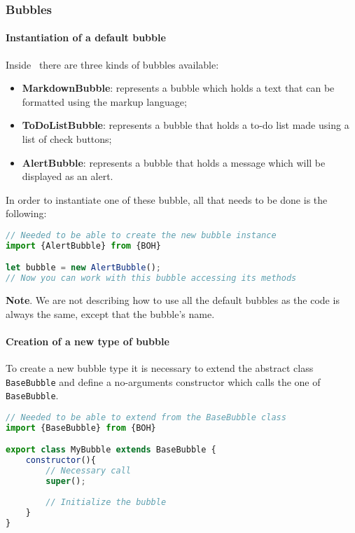 \subsubsection{Bubbles}

\paragraph{Instantiation of a default bubble}
Inside \progettoShort\ there are three kinds of bubbles available:
\begin{itemize}
	\item \textbf{MarkdownBubble}: represents a bubble which holds a text that can be formatted using the  markup language;
	\item \textbf{ToDoListBubble}: represents a bubble that holds a to-do list made using a list of check buttons;
	\item \textbf{AlertBubble}: represents a bubble that holds a message which will be displayed as an alert.
\end{itemize}


In order to instantiate one of these bubble, all that needs to be done is the following:
\begin{lstlisting}[language=JavaScript, frame=single]
// Needed to be able to create the new bubble instance
import {AlertBubble} from {BOH}

let bubble = new AlertBubble();
// Now you can work with this bubble accessing its methods
\end{lstlisting}

\textbf{Note}. We are not describing how to use all the default bubbles as the code is always the same, except that the bubble's name.

\paragraph{Creation of a new type of bubble}
To create a new bubble type it is necessary to extend the abstract class \texttt{BaseBubble} and define a no-arguments constructor which calls the one of \texttt{BaseBubble}. \\
\begin{lstlisting}[language=JavaScript, frame=single]
// Needed to be able to extend from the BaseBubble class
import {BaseBubble} from {BOH}

export class MyBubble extends BaseBubble {
    constructor(){
        // Necessary call
        super();
        
        // Initialize the bubble
    }
}
\end{lstlisting}

